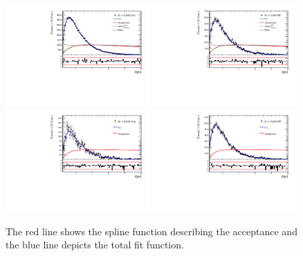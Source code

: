 \begin{figure}[h]
\includegraphics[height=!,width=0.49\textwidth]{figs/Acceptance/adaptive_N4/timeAccRatioFit_norm_combined.pdf}
\includegraphics[height=!,width=0.49\textwidth]{figs/Acceptance/adaptive_N4/timeAccRatioFit_norm_MC_combined.pdf}
\includegraphics[height=!,width=0.49\textwidth]{figs/Acceptance/adaptive_N4/timeAccRatioFit_signal_B0_combined.pdf}
\includegraphics[height=!,width=0.49\textwidth]{figs/Acceptance/adaptive_N4/timeAccRatioFit_signal_MC_combined.pdf}
\caption{The red line shows the spline function describing the acceptance and the blue line depicts the total fit function.}
\label{fig:accFit}
\end{figure}

